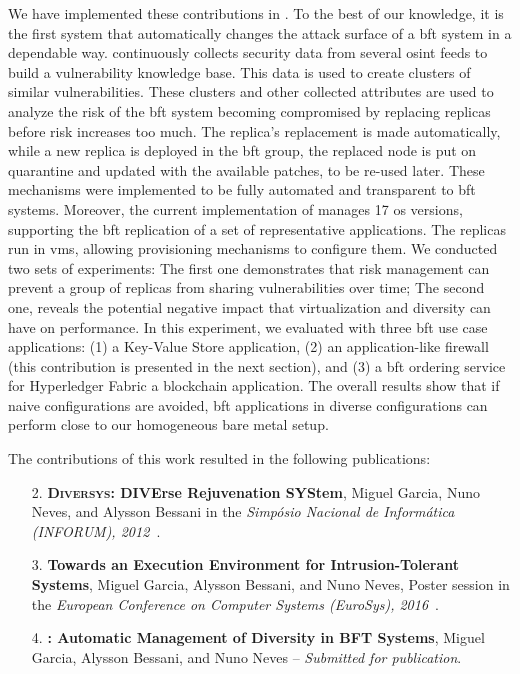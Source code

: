 We have implemented these contributions in \system.
To the best of our knowledge, it is the first system that automatically changes the attack surface of a \gls{bft} system in a dependable way.
\system continuously collects security data from several \gls{osint} feeds to build a vulnerability knowledge base.
This data is used to create clusters of similar vulnerabilities.
These clusters and other collected attributes are used to analyze the risk of the \gls{bft} system becoming compromised by replacing replicas before risk increases too much. 
The replica's replacement is made automatically, while a new replica is deployed in the \gls{bft} group, the replaced node is put on quarantine and updated with the available patches, to be re-used later.
These mechanisms were implemented to be fully automated and transparent to \gls{bft} systems.
Moreover, the current implementation of \system manages 17 \gls{os} versions, supporting the \gls{bft} replication of a set of representative applications.
The replicas run in \glspl{vm}, allowing provisioning mechanisms to configure them. 
We conducted two sets of experiments: The first one demonstrates that \system risk management can prevent a group of replicas from sharing vulnerabilities over time; 
The second one, reveals the potential negative impact that virtualization and diversity can have on performance. 
In this experiment, we evaluated \system with three \gls{bft} use case applications: (1) a Key-Value Store application, (2) \sieveq an application-like firewall (this contribution is presented in the next section), and (3) a \gls{bft} ordering service for Hyperledger Fabric a blockchain application.
The overall results show that if naive configurations are avoided, \gls{bft} applications in diverse configurations can perform close to our homogeneous bare metal setup.

The contributions of this work resulted in the following publications:

\begin{enumerate}

\item[2.] \textbf{\textsc{Diversys}: DIVErse Rejuvenation SYStem}, Miguel Garcia, Nuno Neves, and  Alysson Bessani in the \emph{Simp\'{o}sio Nacional de Inform\'{a}tica (INFORUM), 2012~\cite{Garcia:2012b}}.


\item[3.] \textbf{Towards an Execution Environment for Intrusion-Tolerant Systems}, Miguel Garcia, Alysson Bessani, and Nuno Neves, Poster session in the \emph{European Conference on Computer Systems (EuroSys), 2016}~\cite{Garcia:2016b}.


\item[4.] \textbf{\system: Automatic Management of Diversity in BFT Systems}, Miguel Garcia, Alysson Bessani, and Nuno Neves -- \emph{Submitted for publication}.

\end{enumerate}



